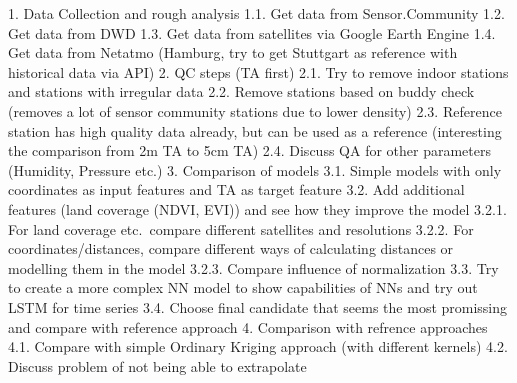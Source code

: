 1. Data Collection and rough analysis
  1.1. Get data from Sensor.Community
  1.2. Get data from DWD
  1.3. Get data from satellites via Google Earth Engine
  1.4. Get data from Netatmo (Hamburg, try to get Stuttgart as reference with historical data via API)
2. QC steps (TA first)
  2.1. Try to remove indoor stations and stations with irregular data
  2.2. Remove stations based on buddy check (removes a lot of sensor community stations due to lower density)
  2.3. Reference station has high quality data already, but can be used as a reference (interesting the comparison from 2m TA to 5cm TA)
  2.4. Discuss QA for other parameters (Humidity, Pressure etc.)
3. Comparison of models
  3.1. Simple models with only coordinates as input features and TA as target feature
  3.2. Add additional features (land coverage (NDVI, EVI)) and see how they improve the model
    3.2.1. For land coverage etc.\ compare different satellites and resolutions
    3.2.2. For coordinates/distances, compare different ways of calculating distances or modelling them in the model
    3.2.3. Compare influence of normalization
  3.3. Try to create a more complex NN model to show capabilities of NNs and try out LSTM for time series
  3.4. Choose final candidate that seems the most promissing and compare with reference approach
4. Comparison with refrence approaches
  4.1. Compare with simple Ordinary Kriging approach (with different kernels)
  4.2. Discuss problem of not being able to extrapolate
